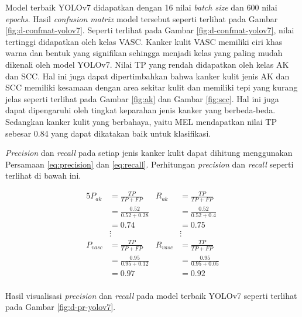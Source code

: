 Model terbaik YOLOv7 didapatkan dengan 16 nilai \textit{batch size} dan 600 nilai \textit{epochs}. Hasil \textit{confusion matrix} model tersebut seperti terlihat pada Gambar \ref{fig:d-confmat-yolov7}. Seperti terlihat pada Gambar \ref{fig:d-confmat-yolov7}, nilai tertinggi didapatkan oleh kelas VASC. Kanker kulit VASC memiliki ciri khas warna dan bentuk yang signifikan sehingga menjadi kelas yang paling mudah dikenali oleh model YOLOv7. Nilai TP yang rendah didapatkan oleh kelas AK dan SCC. Hal ini juga dapat dipertimbahkan bahwa kanker kulit jenis AK dan SCC memiliki kesamaan dengan area sekitar kulit dan memiliki tepi yang kurang jelas seperti terlihat pada Gambar \ref{fig:ak} dan Gambar \ref{fig:scc}. Hal ini juga dapat dipengaruhi oleh tingkat keparahan jenis kanker yang berbeda-beda. Sedangkan kanker kulit yang berbahaya, yaitu MEL mendapatkan nilai TP sebesar 0.84 yang dapat dikatakan baik untuk klasifikasi. 

\textit{Precision} dan \textit{recall} pada setiap jenis kanker kulit dapat dihitung menggunakan Persamaan \ref{eq:precision} dan \ref{eq:recall}. Perhitungan \textit{precision} dan \textit{recall} seperti terlihat di bawah ini.

\begin{alignat*}{5}
    P_{ak}   &= \frac{TP}{TP+FP}         & R_{ak}   &= \frac{TP}{TP+FP} \\
             &= \frac{0.52}{0.52 + 0.28} &          &= \frac{0.52}{0.52 + 0.4} \\
             &= 0.74                     &          &= 0.75 \\
             &\vdots                     &          &\vdots \\
    P_{vasc} &= \frac{TP}{TP+FP}         & R_{vasc} &= \frac{TP}{TP+FP} \\
             &= \frac{0.95}{0.95 + 0.12} &          &= \frac{0.95}{0.95 + 0.05} \\
             &= 0.97                     &          &= 0.92 \\
\end{alignat*}

Hasil visualisasi \textit{precision} dan \textit{recall} pada model terbaik YOLOv7 seperti terlihat pada Gambar \ref{fig:d-pr-yolov7}.

